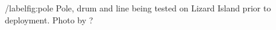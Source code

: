 /label{fig:pole} Pole, drum and line being tested on Lizard Island prior to deployment. Photo by ?
    